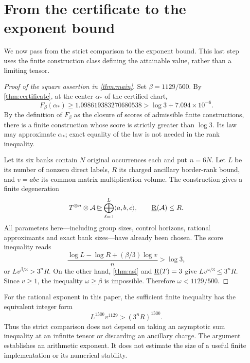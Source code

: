 \section{From the certificate to the exponent bound}\label{sec:conclusion}

We now pass from the strict comparison to the exponent bound.
This last step uses the finite construction class defining the attainable
value, rather than a limiting tensor.

\begin{proof}[Proof of the square assertion in \cref{thm:main}]
Set \(\beta=1129/500\).
By \cref{thm:certificate}, at the center \(\alpha_*\) of the certified chart,
\[
F_\beta(\alpha_*)\ge 1.098619383270680538
>\log3+7.094\times10^{-6}.
\]
By the definition of \(F_\beta\) as the closure of scores of admissible
finite constructions, there is a finite construction whose score is
strictly greater than \(\log3\).
Its law may approximate \(\alpha_*\); exact equality of the law is not
needed in the rank inequality.

Let its six banks contain \(N\) original occurrences each and put \(n=6N\).
Let \(L\) be its number of nonzero direct labels,
\(R\) its charged ancillary border-rank bound, and
\(v=abc\) its common matrix multiplication volume.
The construction gives a finite degeneration
\[
T^{\otimes n}\otimes\mathcal A
\unrhd\bigoplus_{\ell=1}^L\langle a,b,c\rangle,
\qquad \operatorname{\underline R}(\mathcal A)\le R.
\]
All parameters here---including group sizes, control horizons, rational
approximants and exact bank sizes---have already been chosen.
The score inequality reads
\[
\frac{\log L-\log R+(\beta/3)\log v}{n}>\log3,
\]
or \(Lv^{\beta/3}>3^nR\).
On the other hand, \cref{thm:asi} and \(\operatorname{\underline R}(T)=3\) give
\(Lv^{\omega/3}\le3^nR\).
Since \(v\ge1\), the inequality \(\omega\ge\beta\) is impossible.
Therefore \(\omega<1129/500\).
\end{proof}

For the rational exponent in this paper, the sufficient finite inequality
has the equivalent integer form
\[
L^{1500}v^{1129}>(3^nR)^{1500}.
\]
Thus the strict comparison does not depend on taking an asymptotic sum
inequality at an infinite tensor or discarding an ancillary charge.
The argument establishes an arithmetic exponent.  It does not estimate
the size of a useful finite implementation or its numerical stability.
